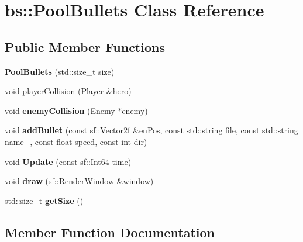 \hypertarget{classbs_1_1_pool_bullets}{}\section{bs\+:\+:Pool\+Bullets Class Reference}
\label{classbs_1_1_pool_bullets}
\subsection*{Public Member Functions}
\begin{DoxyCompactItemize}
\item 
\mbox{\label{classbs_1_1_pool_bullets_a9d0c69bfd2279e0151ed28439bb53d36}} 
{\bfseries Pool\+Bullets} (std\+::size\+\_\+t size)
\item 
void \hyperlink{classbs_1_1_pool_bullets_a000d643a8fbe7445fef483a474f280f2}{player\+Collision} (\hyperlink{class_player}{Player} \&hero)
\item 
\mbox{\label{classbs_1_1_pool_bullets_af7943a4ef9e310f49c5f4843790dd2f4}} 
void {\bfseries enemy\+Collision} (\hyperlink{class_enemy}{Enemy} $\ast$enemy)
\item 
\mbox{\label{classbs_1_1_pool_bullets_a014b33cf9f98d78fbd6f99e5ed433287}} 
void {\bfseries add\+Bullet} (const sf\+::\+Vector2f \&en\+Pos, const std\+::string file, const std\+::string name\+\_\+, const float speed, const int dir)
\item 
\mbox{\label{classbs_1_1_pool_bullets_a69c5a604921b0d7c6024d605b8b0b6ff}} 
void {\bfseries Update} (const sf\+::\+Int64 time)
\item 
\mbox{\label{classbs_1_1_pool_bullets_a47595b6fc041a91f71df69d750f61545}} 
void {\bfseries draw} (sf\+::\+Render\+Window \&window)
\item 
\mbox{\label{classbs_1_1_pool_bullets_a99bdbe126b10e249e06dd23d1daff76d}} 
std\+::size\+\_\+t {\bfseries get\+Size} ()
\end{DoxyCompactItemize}


\subsection{Member Function Documentation}
\mbox{\label{classbs_1_1_pool_bullets_a000d643a8fbe7445fef483a474f280f2}} 
